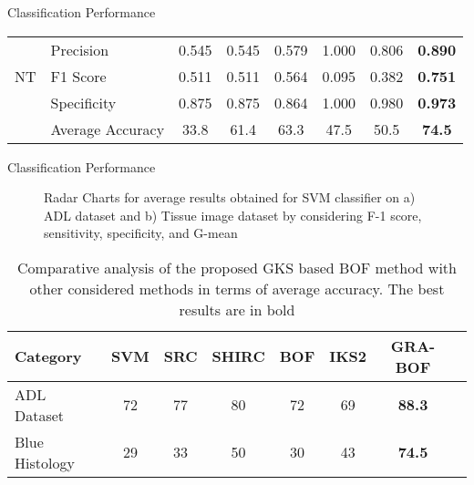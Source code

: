 \documentclass [9pt,times] {beamer}
\begin{document}
\begin{frame}{Classification Performance}
\begin{table}
{\begin{tabular}{|c|l|c|c|c|c|c|c|}
    &    Precision    &    0.545    &    0.545    &    0.579    &    1.000    &    0.806    &\textbf{    0.890}    \\
NT    &    F1 Score     &    0.511    &    0.511    &    0.564    &    0.095    &    0.382    &\textbf{    0.751    }\\
    &    Specificity    &    0.875    &    0.875    &    0.864    &    1.000    &    0.980    &    \textbf{0.973}    \\
    \cline{2-8}
    &    Average Accuracy    &    33.8    &    61.4    &    63.3    &    47.5    &    50.5    &\textbf{    74.5    }\\

\hline
\end{tabular}
}

\end{table}

\end{frame}


\begin{frame}{Classification Performance}

\begin{figure}
\centering
{}

 \caption{{\scriptsize Radar Charts for average results obtained for SVM classifier on a) ADL dataset and b) Tissue image dataset by considering F-1 score, sensitivity, specificity, and G-mean}}
\label{fig:rc}
\end{figure}

\begin{table}
\renewcommand{\arraystretch}{1.2}
	\centering
	\scriptsize
	\caption{{\scriptsize Comparative analysis of the proposed GKS based BOF method with other considered methods in terms of average accuracy. The best results are in bold	}}
	\label{tab:adl}
	\begin{tabular}{|p{1.2in}|c|c|c|c|c|c|c|}
		\hline
		\textbf{Category}   &	\textbf{SVM}	&	\textbf{SRC}	&	\textbf{SHIRC}	&	\textbf{BOF} & \textbf{IKS2} & \textbf{GRA-BOF}	\\
		\hline
	ADL Dataset &  72 & 77 & 80 &  72& 69& \textbf{88.3}\\
	Blue Histology  &  29 & 33 & 50 &30 & 43& \textbf{74.5}\\
	\hline	
	\end{tabular}
\end{table}


\end{frame}
\end{document}
